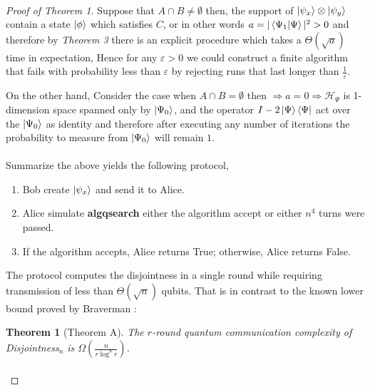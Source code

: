 \documentclass{article}
\newtheorem*{theorem*}{Theorem}
\begin{document}
\paragraph{} 

\begin{proof}[Proof of Theorem 1]
Suppose that \( A \cap B \neq \emptyset \) then, the support of \( \ket{\psi_x} \otimes \ket{\psi_y} \) contain a state \( \ket{\phi} \) which satisfies \(C\), or in other words $a = |\braket{\Psi_1|\Psi}|^2 > 0 $ and therefore by \textit{Theorem 3} there is an explicit procedure which takes a $\Theta(\sqrt{a})$ time in expectation, Hence for any \(\varepsilon >0\) we could construct a finite algorithm that fails with probability less than $ \varepsilon $ by rejecting runs that last longer than $\frac{1}{\varepsilon}$. 
  
On the other hand, Consider the case when \(A \cap B = \emptyset\) then $\Rightarrow a = 0 \Rightarrow \mathcal{H}_{\Psi}$ is 1-dimension space spanned only by $\ket{\Psi_0} $, and the operator $ I - 2 \ket{\Psi}\bra{\Psi} $ act over the $ \ket{\Psi_0}  $ as identity and therefore after executing any number of iterations the probability to measure from $\ket{\Psi_0}$ will remain $1$.

\paragraph{}Summarize the above yields the following protocol,
\begin{enumerate}
    \item Bob create \( \ket{\psi_x} \) and send it to Alice.
    \item Alice simulate \textbf{algqsearch} either the algorithm accept or either $n^4$ turns were passed.     
    \item If the algorithm accepts, Alice returns True; otherwise, Alice returns False. 
\end{enumerate}

The protocol computes the disjointness in a single round while requiring transmission of less than $\Theta\left( \sqrt{n} \right)$ qubits. That is in contrast to the known lower bound proved by Braverman \cite{Braverman}: 
\begin{theorem*}[Theorem A] The $r$-round quantum communication complexity of Disjointness$_n$ is $ \Omega\left( \frac{n}{r \log^8 r} \right)$.
\end{theorem*}
\paragraph{}
\end{proof}
\end{document}
